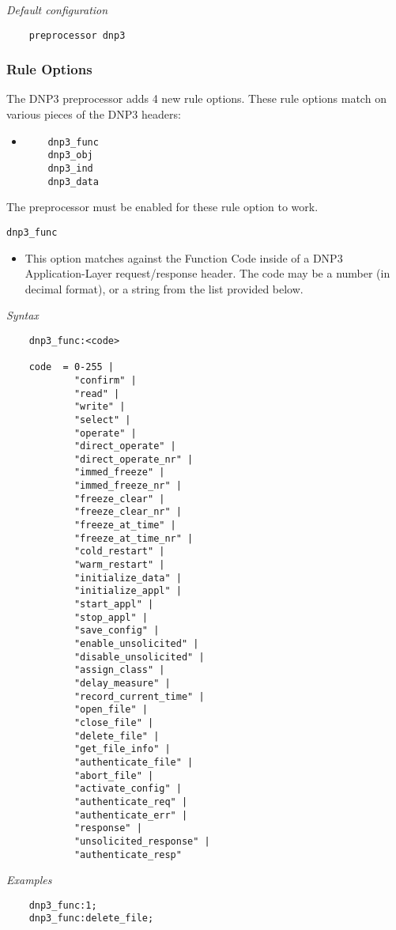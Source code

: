 \documentclass[english]{report}
\begin{document}
\textit{Default configuration}
\footnotesize
\begin{verbatim}
    preprocessor dnp3
\end{verbatim}
\normalsize

\subsubsection{Rule Options}
The DNP3 preprocessor adds 4 new rule options. These rule options match on
various pieces of the DNP3 headers:

\begin{itemize}
\item[]
\begin{verbatim}
    dnp3_func
    dnp3_obj
    dnp3_ind
    dnp3_data
\end{verbatim}
\end{itemize}

The preprocessor must be enabled for these rule option to work.

\texttt{dnp3\_func}
\label{dnp3:dnp3_func}
\begin{itemize}
 \item[] This option matches against the Function Code inside of a DNP3
     Application-Layer request/response header. The code may be a number
     (in decimal format), or a string from the list provided below.
\end{itemize}

\textit{Syntax}
\footnotesize
\begin{verbatim}
    dnp3_func:<code>

    code  = 0-255 |
            "confirm" |
            "read" |
            "write" |
            "select" |
            "operate" |
            "direct_operate" |
            "direct_operate_nr" |
            "immed_freeze" |
            "immed_freeze_nr" |
            "freeze_clear" |
            "freeze_clear_nr" |
            "freeze_at_time" |
            "freeze_at_time_nr" |
            "cold_restart" |
            "warm_restart" |
            "initialize_data" |
            "initialize_appl" |
            "start_appl" |
            "stop_appl" |
            "save_config" |
            "enable_unsolicited" |
            "disable_unsolicited" |
            "assign_class" |
            "delay_measure" |
            "record_current_time" |
            "open_file" |
            "close_file" |
            "delete_file" |
            "get_file_info" |
            "authenticate_file" |
            "abort_file" |
            "activate_config" |
            "authenticate_req" |
            "authenticate_err" |
            "response" |
            "unsolicited_response" |
            "authenticate_resp"

\end{verbatim}
\normalsize
\textit{Examples}
\footnotesize
\begin{verbatim}
    dnp3_func:1;
    dnp3_func:delete_file;
\end{verbatim}
\normalsize
\end{document}
